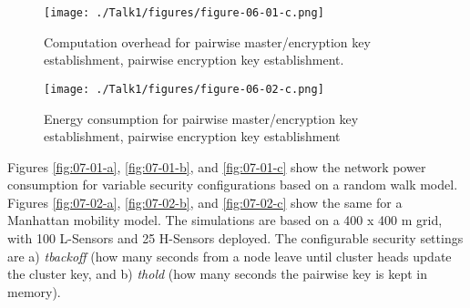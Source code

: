 \documentclass[12pt,a4paper,twoside]{report}
\begin{document}
\begin{figure}[ht]
	\begin{center}
  \texttt{[image: ./Talk1/figures/figure-06-01-c.png]}
  \end{center}
  \caption{Computation overhead for pairwise master/encryption key establishment, pairwise encryption key establishment. \cite{seo;etal:2015}}
  \label{fig:06-01-c}
\end{figure}
\begin{figure}[ht]
	\begin{center}
  \texttt{[image: ./Talk1/figures/figure-06-02-c.png]}
  \end{center}
  \caption{Energy consumption for pairwise master/encryption key establishment, pairwise encryption key establishment   \cite{seo;etal:2015}}
  \label{fig:06-02-c}
\end{figure}

Figures \ref{fig:07-01-a}, \ref{fig:07-01-b}, and \ref{fig:07-01-c} show the network power consumption for variable security configurations based on a random walk model. Figures \ref{fig:07-02-a}, \ref{fig:07-02-b}, and \ref{fig:07-02-c} show the same for a Manhattan mobility model. The simulations are based on a 400 x 400 m grid, with 100 L-Sensors and 25 H-Sensors deployed. The configurable security settings are a) \emph{tbackoff} (how many seconds from a node leave until cluster heads update the cluster key, and b) \emph{thold} (how many seconds the pairwise key is kept in memory).\par
\end{document}
